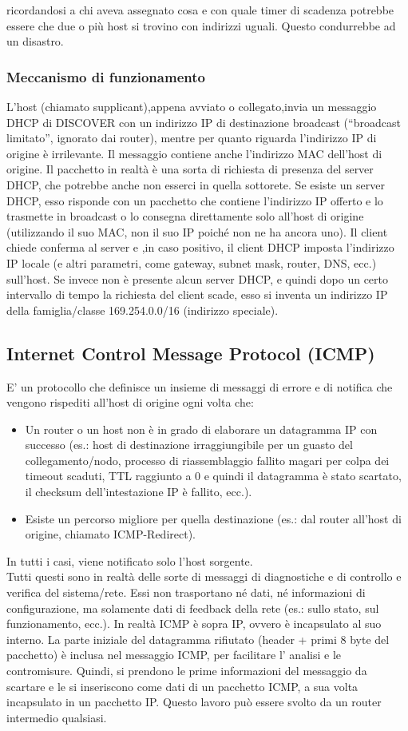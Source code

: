 ricordandosi a chi aveva assegnato cosa e con quale timer di scadenza potrebbe essere che due o più host si trovino con indirizzi uguali. Questo condurrebbe ad un disastro.
\subsubsection{Meccanismo di funzionamento}
L’host (chiamato supplicant),appena avviato o collegato,invia un messaggio DHCP di DISCOVER con un indirizzo IP di destinazione broadcast (“broadcast limitato”, ignorato dai router), mentre per quanto riguarda l’indirizzo IP di origine è irrilevante. Il messaggio contiene anche l’indirizzo MAC dell’host di origine. Il pacchetto in realtà è una sorta di richiesta di presenza del server DHCP, che potrebbe anche non esserci in quella sottorete. Se esiste un server DHCP, esso risponde con un pacchetto che contiene l’indirizzo IP offerto e lo trasmette in broadcast o lo consegna direttamente solo all’host di origine (utilizzando il suo MAC, non il suo IP poiché non ne ha ancora uno). Il client chiede conferma al server e ,in caso positivo, il client DHCP imposta l’indirizzo IP locale (e altri parametri, come gateway, subnet mask, router, DNS, ecc.) sull’host. Se invece non è presente alcun server DHCP, e quindi dopo un certo intervallo di tempo la richiesta del client scade, esso si inventa un indirizzo IP della famiglia/classe 169.254.0.0/16 (indirizzo speciale).
\subsection{Internet Control Message Protocol (ICMP)}
E' un protocollo che definisce un insieme di messaggi di errore e di notifica che vengono rispediti all’host di origine ogni volta che:
\begin{itemize}
  \item  Un router o un host non è in grado di elaborare un datagramma IP con successo (es.: host di destinazione irraggiungibile per un guasto del collegamento/nodo, processo di riassemblaggio fallito magari per colpa dei timeout scaduti, TTL raggiunto a 0 e quindi il datagramma è stato scartato, il checksum dell’intestazione IP è fallito, ecc.).
  \item Esiste un percorso migliore per quella destinazione (es.: dal router all’host di origine, chiamato ICMP-Redirect).
\end{itemize}
In tutti i casi, viene notificato solo l’host sorgente. \\
Tutti questi sono in realtà delle sorte di messaggi di diagnostiche e di controllo e verifica del sistema/rete. Essi non trasportano né dati, né informazioni di configurazione, ma solamente dati di feedback della rete (es.: sullo stato, sul funzionamento, ecc.). In realtà ICMP è sopra IP, ovvero è incapsulato al suo interno. La parte iniziale del datagramma rifiutato (header + primi 8 byte del pacchetto) è inclusa nel messaggio ICMP, per facilitare l’ analisi e le contromisure. Quindi, si prendono le prime informazioni del messaggio da scartare e le si inseriscono come dati di un pacchetto ICMP, a sua volta incapsulato in un pacchetto IP. Questo lavoro può essere svolto da un router intermedio qualsiasi.
